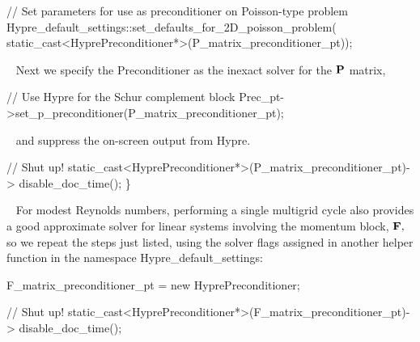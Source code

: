 \begin{DoxyEnumerate}
\begin{DoxyCodeInclude}
     \textcolor{comment}{// Set parameters for use as preconditioner on Poisson-type problem}
     Hypre\_default\_settings::set\_defaults\_for\_2D\_poisson\_problem(
      static\_cast<HyprePreconditioner*>(P\_matrix\_preconditioner\_pt));

\end{DoxyCodeInclude}
 ~\newline
 Next we specify the {\ttfamily Preconditioner} as the inexact solver for the $ {\bf P} $ matrix, ~\newline
~\newline
 
\begin{DoxyCodeInclude}
     
     \textcolor{comment}{// Use Hypre for the Schur complement block}
     Prec\_pt->set\_p\_preconditioner(P\_matrix\_preconditioner\_pt);

\end{DoxyCodeInclude}
 ~\newline
 and suppress the on-\/screen output from Hypre. ~\newline
~\newline
 
\begin{DoxyCodeInclude}
     
     \textcolor{comment}{// Shut up!}
     \textcolor{keyword}{static\_cast<}HyprePreconditioner*\textcolor{keyword}{>}(P\_matrix\_preconditioner\_pt)->
      disable\_doc\_time();
    \}

\end{DoxyCodeInclude}
 ~\newline
 For modest Reynolds numbers, performing a single multigrid cycle also provides a good approximate solver for linear systems involving the momentum block, $ {\bf F}, $ so we repeat the steps just listed, using the solver flags assigned in another helper function in the namespace {\ttfamily Hypre\+\_\+default\+\_\+settings\+:} ~\newline
~\newline
 
\begin{DoxyCodeInclude}
       F\_matrix\_preconditioner\_pt = \textcolor{keyword}{new} HyprePreconditioner;
       
       \textcolor{comment}{// Shut up!}
       \textcolor{keyword}{static\_cast<}HyprePreconditioner*\textcolor{keyword}{>}(F\_matrix\_preconditioner\_pt)->
        disable\_doc\_time();
       

\end{DoxyCodeInclude}
\end{DoxyEnumerate}
